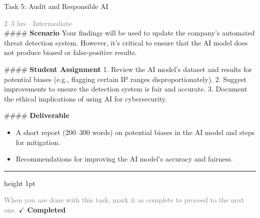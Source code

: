 \documentclass[10pt,a4paper]{article}
\begin{document}
\begin{taskbox}{Task 5: Audit and Responsible AI}

    {\small \textcolor{gray}{2--3 hrs $\cdot$ Intermediate}}\\[12pt]

    \#\#\#\# \textbf{Scenario}  
Your findings will be used to update the company's automated threat detection system. However, it's critical to ensure that the AI model does not produce biased or false-positive results.

\#\#\#\# \textbf{Student Assignment}  
1. Review the AI model's dataset and results for potential biases (e.g., flagging certain IP ranges disproportionately).  
2. Suggest improvements to ensure the detection system is fair and accurate.  
3. Document the ethical implications of using AI for cybersecurity.  

\#\#\#\# \textbf{Deliverable}  
\begin{itemize}
    \item A short report (200–300 words) on potential biases in the AI model and steps for mitigation.  
    \item Recommendations for improving the AI model’s accuracy and fairness.\par
\end{itemize}

    \vspace{16pt}

    \textcolor{cardBorder}{\hrule height 1pt}\vspace{8pt}

    \small \textcolor{gray}{When you are done with this task, mark it as complete to proceed to the next one.} \hfill \textbf{\textcolor{brandDark}{$\checkmark$ Completed}}

\end{taskbox}
\end{document}

